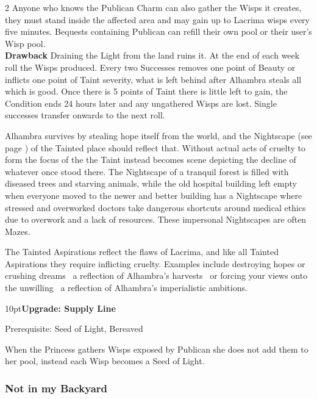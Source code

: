 \begin{multicols}{2}
Anyone who knows the Publican Charm can also gather the Wisps it creates, they must stand inside the affected area and may gain up to Lacrima wisps every five minutes. Bequests containing Publican can refill their own pool or their user's Wisp pool. \\

\noindent \textbf{Drawback} Draining the Light from the land ruins it. At the end of each week roll the Wisps produced. Every two Successes removes one point of Beauty or inflicts one point of Taint severity, what is left behind after Alhambra steals all which is good. Once there is 5 points of Taint there is little left to gain, the Condition ends 24 hours later and any ungathered Wisps are lost. Single successes transfer onwards to the next roll.

Alhambra survives by stealing hope itself from the world, and the Nightscape (see page \pageref{TaintedPlaceRef}) of the Tainted place should reflect that. Without actual acts of cruelty to form the focus of the the Taint instead becomes scene depicting the decline of whatever once stood there. The Nightscape of a tranquil forest is filled with diseased trees and starving animals, while the old hospital building left empty when everyone moved to the newer and better building has a Nightscape where stressed and overworked doctors take dangerous shortcuts around medical ethics due to overwork and a lack of resources. These impersonal Nightscapes are often Mazes. 

The Tainted Aspirations reflect the flaws of Lacrima, and like all Tainted Aspirations they require inflicting cruelty. Examples include destroying hopes or crushing dreams \textemdash\, a reflection of Alhambra's harvests \textemdash\, or forcing your views onto the unwilling \textemdash\, a reflection of Alhambra's imperialistic ambitions. 

\begin{myindentpar}{10pt}\textbf{Upgrade: Supply Line}

Prerequisite: Seed of Light, Bereaved 

When the Princess gathers Wisps exposed by Publican she does not add them to her pool, instead each Wisp becomes a Seed of Light.\end{myindentpar}

\bigsidebarstart

\subsubsection*{Not in my Backyard}


\end{multicols}
